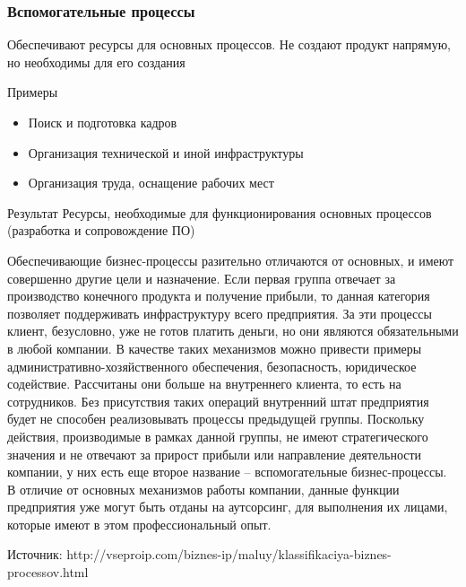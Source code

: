 \documentclass{../industrial-development}
\begin{document}
\begin{frame} \frametitle{Вспомогательные процессы}
	\begin{block}{}
		Обеспечивают ресурсы для основных процессов. Не создают продукт напрямую, но необходимы для его создания
	\end{block}
	\begin{block}{Примеры}
		\begin{itemize}
			\item Поиск и подготовка кадров
			\item Организация технической и иной инфраструктуры
			\item Организация труда, оснащение рабочих мест
		\end{itemize}
	\end{block}
	\begin{block}{Результат}
		Ресурсы, необходимые для функционирования основных процессов (разработка и сопровождение ПО)
	\end{block}
\end{frame}
\lecturenotes

Обеспечивающие бизнес-процессы разительно отличаются от основных, и имеют совершенно другие цели и назначение. Если первая группа отвечает за производство конечного продукта и получение прибыли, то данная категория позволяет поддерживать инфраструктуру всего предприятия. За эти процессы клиент, безусловно, уже не готов платить деньги, но они являются обязательными в любой компании. В качестве таких механизмов можно привести примеры административно-хозяйственного обеспечения, безопасность, юридическое содействие. Рассчитаны они больше на внутреннего клиента, то есть на сотрудников. Без присутствия таких операций внутренний штат предприятия будет не способен реализовывать процессы предыдущей группы. Поскольку действия, производимые в рамках данной группы, не имеют стратегического значения и не отвечают за прирост прибыли или направление деятельности компании, у них есть еще второе название – вспомогательные бизнес-процессы. В отличие от основных механизмов работы компании, данные функции предприятия уже могут быть отданы на аутсорсинг, для выполнения их лицами, которые имеют в этом профессиональный опыт.

Источник: http://vseproip.com/biznes-ip/maluy/klassifikaciya-biznes-processov.html
\end{document}
